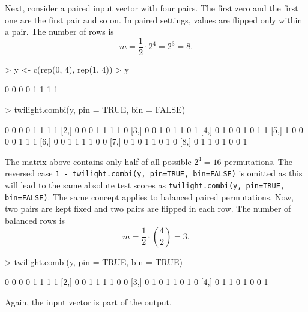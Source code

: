 \documentclass[11pt,a4paper,fleqn]{report}
\newcommand{\Rfunction}[1]{{\texttt{#1}}}
\begin{document}
Next, consider a paired input vector with four pairs. The first zero and the first one are the first pair and so on. In paired settings, values are flipped only within a pair. The number of rows is
\begin{equation}
m = \frac{1}{2} \cdot 2^4 = 2^3 = 8.
\end{equation}
\begin{Schunk}
\begin{Sinput}
> y <- c(rep(0, 4), rep(1, 4))
> y
\end{Sinput}
\begin{Soutput}
[1] 0 0 0 0 1 1 1 1
\end{Soutput}
\end{Schunk}

\begin{Schunk}
\begin{Sinput}
> twilight.combi(y, pin = TRUE, bin = FALSE)
\end{Sinput}
\begin{Soutput}
     [,1] [,2] [,3] [,4] [,5] [,6] [,7] [,8]
[1,]    0    0    0    0    1    1    1    1
[2,]    0    0    0    1    1    1    1    0
[3,]    0    0    1    0    1    1    0    1
[4,]    0    1    0    0    1    0    1    1
[5,]    1    0    0    0    0    1    1    1
[6,]    0    0    1    1    1    1    0    0
[7,]    0    1    0    1    1    0    1    0
[8,]    0    1    1    0    1    0    0    1
\end{Soutput}
\end{Schunk}
       
The matrix above contains only half of all possible $2^4=16$ permutations. The reversed case \Rfunction{1 - twilight.combi(y, pin=TRUE, bin=FALSE)} is omitted as this will lead to the same absolute test scores as \Rfunction{twilight.combi(y, pin=TRUE, bin=FALSE)}. The same concept applies to balanced paired permutations. Now, two pairs are kept fixed and two pairs are flipped in each row. The number of balanced rows is
\begin{equation}
m = \frac{1}{2} \cdot {4 \choose 2} = 3.
\end{equation}
\begin{Schunk}
\begin{Sinput}
> twilight.combi(y, pin = TRUE, bin = TRUE)
\end{Sinput}
\begin{Soutput}
     [,1] [,2] [,3] [,4] [,5] [,6] [,7] [,8]
[1,]    0    0    0    0    1    1    1    1
[2,]    0    0    1    1    1    1    0    0
[3,]    0    1    0    1    1    0    1    0
[4,]    0    1    1    0    1    0    0    1
\end{Soutput}
\end{Schunk}
Again, the input vector is part of the output.
\end{document}
